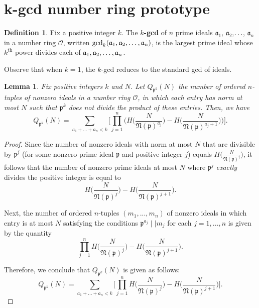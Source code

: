 \documentclass[10pt,a4paper]{article}
\newtheorem{lemma}[theorem]{Lemma}
\theoremstyle{definition}
\newtheorem{definition}{Definition}[section]
\theoremstyle{remark}
\newcommand{\f}[1]{\mathfrak{#1}}
\begin{document}
\section{k-gcd number ring prototype}

\begin{definition} Fix a positive integer $k$. The \textbf{$k$-gcd} of $n$ prime ideals $\f{a}_1$, $\f{a}_2$,$\mathellipsis$, $\f{a}_n$ in a number ring $\mathcal{O}$, written $\gcd_k(\f{a}_1,\f{a}_2, \mathellipsis,\f{a}_n)$, is the largest prime ideal whose $k^{\text{th}}$ power divides each of $\f{a}_1, \f{a}_2,\mathellipsis, \f{a}_n$.
\end{definition}	

\noindent Observe that when $k=1$, the $k$-gcd reduces to the standard gcd of ideals.

\begin{lemma}
	Fix positive integers $k$ and $N$. Let $Q_{\f{p}^k}(N)$ the number of ordered $n$-tuples of nonzero ideals in a number ring $\mathcal{O}$, in which each entry has norm at most $N$ such that $\f{p}^k$ does not divide the product of these entries. Then, we have
	$$Q_{\f{p}^k}(N) = \sum_{a_1+...+a_n < k} \Big[\prod_{j=1}^n \Big(H\bigg( \frac{N}{\f{N}(\f{p})^{a_j}}\bigg) - H\bigg(\frac{N}{\f{N}(\f{p})^{a_j + 1}}\bigg)\Big)\Big].$$
\end{lemma}

\begin{proof}
	Since the number of nonzero ideals with norm at most $N$ that are divisible by $\f{p}^j$ (for some nonzero prime ideal $\f{p}$ and positive integer $j$) equals $H\big(\frac{N}{\f{N}(\f{p})^j}\big)$, it follows that the number of nonzero prime ideals at most $N$ where $\f{p}^j$ \textit{exactly} divides the positive integer is equal to
	$$H\bigg(\frac{N}{\f{N}(\f{p})^j}\bigg) - H\bigg(\frac{N}{\f{N}(\f{p})^{j+1}}\bigg).$$
	
	\noindent Next, the number of ordered $n$-tuples $(m_1, ..., m_n)$ of nonzero ideals in which entry is at most $N$ satisfying the conditions $\f{p}^{a_j} \mid\mid m_j$ for each $j = 1, ..., n$ is given by the quantity
	$$\prod_{j=1}^n H\bigg(\frac{N}{\f{N}(\f{p})^j}\bigg) - H\bigg(\frac{N}{\f{N}(\f{p})^{j+1}}\bigg).$$
	
	\noindent Therefore, we conclude that $Q_{\f{p}^k}(N)$ is given as follows:
	$$Q_{\f{p}^k}(N) = \sum_{a_1+...+a_n < k} \bigg[\prod_{j=1}^n H\bigg(\frac{N}{\f{N}(\f{p})^j}\bigg) - H\bigg(\frac{N}{\f{N}(\f{p})^{j+1}}\bigg)\bigg].$$ 
\end{proof}
\end{document}

